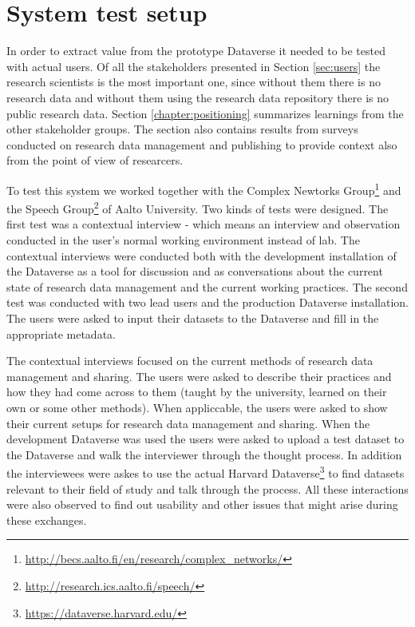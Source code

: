 \section{System test setup}
\label{sec:system_testing}

In order to extract value from the prototype Dataverse it needed to be tested
with actual users. Of all the stakeholders presented in Section \ref{sec:users}
the research scientists is the most important one, since without them there is
no research data and without them using the research data repository there is
no public research data. Section \ref{chapter:positioning} summarizes learnings
from the other stakeholder groups. The section also contains results from
surveys conducted on research data management and publishing to provide context
also from the point of view of researcers.

To test this system we worked together with the Complex Newtorks
Group\footnote{\url{http://becs.aalto.fi/en/research/complex\_networks/}} and the
Speech Group\footnote{\url{http://research.ics.aalto.fi/speech/}} of Aalto
University. Two kinds of tests were designed. The first test was a contextual
interview - which means an interview and observation conducted in the user's normal working
environment instead of lab. The contextual interviews were conducted both with
the development installation of the Dataverse as a tool for discussion and as
conversations about the current state of research data management and the
current working practices. The second test was conducted with two lead users
and the production Dataverse installation. The users were asked to input their
datasets to the Dataverse and fill in the appropriate metadata.

The contextual interviews focused on the current methods of research data
management and sharing. The users were asked to describe their practices and
how they had come across to them (taught by the university, learned on their
own or some other methods). When appliccable, the users were asked to show
their current setups for research data management and sharing. When the
development Dataverse was used the users were asked to upload a test dataset
to the Dataverse and walk the interviewer through the thought process. In
addition the interviewees were askes to use the actual Harvard
Dataverse\footnote{\url{https://dataverse.harvard.edu/}} to find datasets
relevant to their field of study and talk through the process. All these
interactions were also observed to find out usability and other issues that
might arise during these exchanges.

